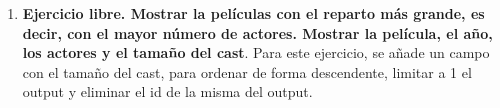 \documentclass[a4paper,onecolumn]{article}
\begin{document}
\begin{sloppypar}
\begin{enumerate}
\begin{figure}[H]
\begin{subfigure}[b]{0.45\textwidth}
        \end{subfigure}
        \hfill
        \begin{subfigure}[b]{0.45\textwidth}
        \end{subfigure}
   \end{figure}
   \newpage
    \item \textbf{Ejercicio libre. Mostrar la películas con el reparto más grande, es decir, con el mayor número de actores. Mostrar la película, el año, los actores y el tamaño del cast}.
    Para este ejercicio, se añade un campo con el tamaño del cast, para ordenar de forma descendente, limitar a 1 el output y eliminar el id de la misma del output.
    \begin{figure}[H]
        \begin{subfigure}[b]{0.6\textwidth}
            \centering

\end{subfigure}
\end{figure}
\end{enumerate}
\end{sloppypar}
\end{document}
